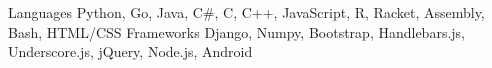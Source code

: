 

\begin{cvskills}
    \cvskill
        {Languages}
        {Python, Go, Java, C\#, C, C++, JavaScript, R, Racket, Assembly, Bash, HTML/CSS}
    \cvskill
        {Frameworks}
        {Django, Numpy, Bootstrap, Handlebars.js, Underscore.js, jQuery, Node.js, Android}

\end{cvskills}
